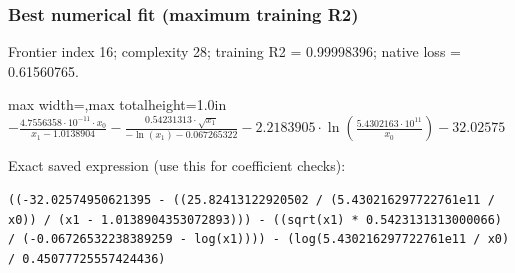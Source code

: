 \documentclass[10pt,letterpaper,landscape]{article}
\begin{document}
\begin{minipage}[t]{0.485\textwidth}
\subsubsection*{Best numerical fit (maximum training R2)}
Frontier index 16; complexity 28; training R2 = 0.99998396; native loss = 0.61560765.
\begin{center}\begin{adjustbox}{max width=\linewidth,max totalheight=1.0in}$\displaystyle - \frac{4.7556358 \cdot 10^{-11} \cdot x_{0}}{x_{1} - 1.0138904} - \frac{0.54231313 \cdot \sqrt{x_{1}}}{- \ln{\left(x_{1} \right)} - 0.067265322} - 2.2183905 \cdot \ln{\left(\frac{5.4302163 \cdot 10^{11}}{x_{0}} \right)} - 32.02575$\end{adjustbox}\end{center}
{\scriptsize Exact saved expression (use this for coefficient checks):}
\begin{lstlisting}
((-32.02574950621395 - ((25.82413122920502 / (5.430216297722761e11 / x0)) / (x1 - 1.0138904353072893))) - ((sqrt(x1) * 0.5423131313000066) / (-0.06726532238389259 - log(x1)))) - (log(5.430216297722761e11 / x0) / 0.45077725557424436)
\end{lstlisting}
\end{minipage}\hfill
\end{document}
